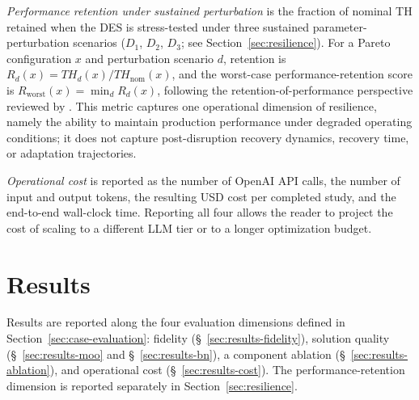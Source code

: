 \documentclass[a4paper,fleqn]{cas-sc}
\begin{document}
  \emph{Performance retention under sustained perturbation} is the fraction of nominal TH retained when the DES is stress-tested under three sustained parameter-perturbation scenarios ($D_1$, $D_2$, $D_3$; see Section~\ref{sec:resilience}). For a Pareto configuration $x$ and perturbation scenario $d$, retention is $R_d(x) = TH_d(x) / TH_\mathrm{nom}(x)$, and the worst-case performance-retention score is $R_\mathrm{worst}(x) = \min_d R_d(x)$, following the retention-of-performance perspective reviewed by \citet{Hosseini2016}. This metric captures one operational dimension of resilience, namely the ability to maintain production performance under degraded operating conditions; it does not capture post-disruption recovery dynamics, recovery time, or adaptation trajectories.          

  \emph{Operational cost} is reported as the number of OpenAI API calls, the number of input and output tokens, the     
  resulting USD cost per completed study, and the end-to-end wall-clock time. Reporting all four allows the reader to
  project the cost of scaling to a different LLM tier or to a longer optimization budget.                               
                                                            
                                                                                         
  \section{Results}\label{sec:results}                                                                                  
                                                                                                                        
  Results are reported along the four evaluation dimensions defined in Section~\ref{sec:case-evaluation}: fidelity      
  (\S~\ref{sec:results-fidelity}), solution quality (\S~\ref{sec:results-moo} and \S~\ref{sec:results-bn}), a component 
  ablation (\S~\ref{sec:results-ablation}), and operational cost (\S~\ref{sec:results-cost}). The performance-retention dimension is reported separately in Section~\ref{sec:resilience}.   
\end{document}
